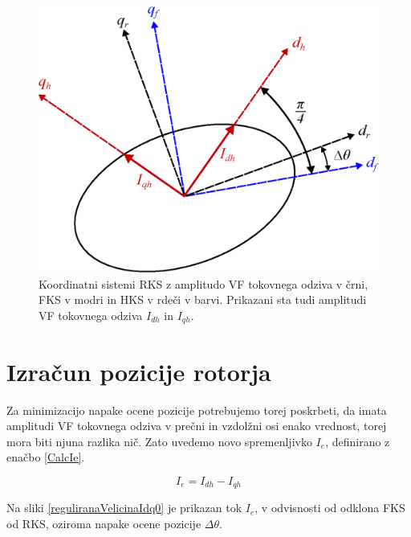 \documentclass[a4paper,twoside,openright,12pt,slovene]{book}
\begin{document}
\begin{figure}[!htbp]
    \centering
    \includegraphics[width=0.7\columnwidth]{Slike/Inkscape/koordinatniSistem.eps}
    \caption{\label{koordinatniSistem} Koordinatni sistemi RKS z amplitudo VF tokovnega odziva v črni, FKS v modri in HKS v rdeči v barvi. Prikazani sta tudi amplitudi VF tokovnega odziva $I_{dh}$ in $I_{qh}$.}
\end{figure}

\newpage
\section{Izračun pozicije rotorja}

Za minimizacijo napake ocene pozicije potrebujemo torej poskrbeti, da imata amplitudi VF tokovnega odziva v prečni in vzdolžni osi enako vrednost, torej mora biti njuna razlika nič. 
Zato uvedemo novo spremenljivko $I_e$, definirano z enačbo \ref{CalcIe}.

\begin{equation} \label{CalcIe}
    I_e = I_{dh} - I_{qh}
\end{equation}

Na sliki \ref{reguliranaVelicinaIdq0} je prikazan tok $I_e$, v odvisnosti od odklona FKS od RKS, oziroma napake ocene pozicije $\Delta\theta$. 
\end{document}
